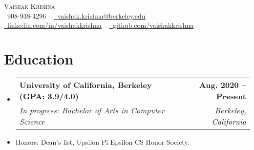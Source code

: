 \documentclass[letterpaper,11pt]{article}
\makeatletter
\newcommand{\resumeSubheading}[4]{
  \vspace{-2pt}\item
    \begin{tabular*}{1.0\textwidth}[t]{l@{\extracolsep{\fill}}r}
      \textbf{#1} & \textbf{\small #2} \\
      \textit{\small#3} & \textit{\small #4} \\
    \end{tabular*}\vspace{-7pt}
}
\newcommand{\resumeSubHeadingListStart}{\begin{itemize}[leftmargin=0.0in, label={}]}
\newcommand{\resumeSubHeadingListEnd}{\end{itemize}}
\makeatother
\begin{document}

\begin{center}
    {\Huge \scshape Vaishak Krishna} \\ \vspace{1pt}
    \small \raisebox{-0.1\height}\faPhone\ 908-938-4296 ~ \href{mailto:vaishak.krishna@berkeley.edu}{\raisebox{-0.2\height}\faEnvelope\  \underline{vaishak.krishna@berkeley.edu}} ~ 
    \href{https://linkedin.com/in/vaishakkrishna/}{\raisebox{-0.2\height}\faLinkedin\ \underline{linkedin.com/in/vaishakkrishna}}  ~
    \href{https://github.com/vaishakkrishna}{\raisebox{-0.2\height}\faGithub\ \underline{github.com/vaishakkrishna}}
    \vspace{-8pt}
\end{center}


\section{Education}
  \resumeSubHeadingListStart
    \resumeSubheading
  {University of California, Berkeley (GPA: 3.9/4.0)}{Aug. 2020 -- Present}
      {In progress: Bachelor of Arts in Computer Science}{Berkeley, California}
    \vspace{-5pt}
      \item{Honors: Dean's list, Upsilon Pi Epsilon CS Honor Society.}

  \resumeSubHeadingListEnd
  
\vspace{-12pt}
\end{document}
